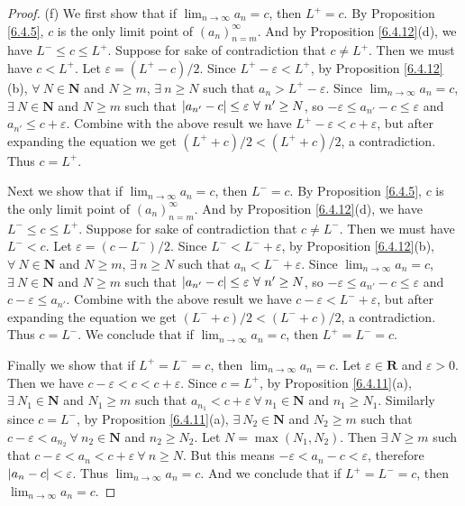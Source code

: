 \begin{proof}{(f)}
    We first show that if \(\lim_{n \to \infty} a_n = c\), then \(L^+ = c\).
    By Proposition \ref{6.4.5}, \(c\) is the only limit point of \((a_n)_{n = m}^\infty\).
    And by Proposition \ref{6.4.12}(d), we have \(L^- \leq c \leq L^+\).
    Suppose for sake of contradiction that \(c \neq L^+\).
    Then we must have \(c < L^+\).
    Let \(\varepsilon = (L^+ - c) / 2\).
    Since \(L^+ - \varepsilon < L^+\), by Proposition \ref{6.4.12}(b), \(\forall\ N \in \mathbf{N}\) and \(N \geq m\), \(\exists\ n \geq N\) such that \(a_n > L^+ - \varepsilon\).
    Since \(\lim_{n \to \infty} a_n = c\), \(\exists\ N \in \mathbf{N}\) and \(N \geq m\) such that \(\abs*{a_{n'} - c} \leq \varepsilon \ \forall\ n' \geq N\), so \(-\varepsilon \leq a_{n'} - c \leq \varepsilon\) and \(a_{n'} \leq c + \varepsilon\).
    Combine with the above result we have \(L^+ - \varepsilon < c + \varepsilon\), but after expanding the equation we get \((L^+ + c) / 2 < (L^+ + c) / 2\), a contradiction.
    Thus \(c = L^+\).

    Next we show that if \(\lim_{n \to \infty} a_n = c\), then \(L^- = c\).
    By Proposition \ref{6.4.5}, \(c\) is the only limit point of \((a_n)_{n = m}^\infty\).
    And by Proposition \ref{6.4.12}(d), we have \(L^- \leq c \leq L^+\).
    Suppose for sake of contradiction that \(c \neq L^-\).
    Then we must have \(L^- < c\).
    Let \(\varepsilon = (c - L^-) / 2\).
    Since \(L^- < L^- + \varepsilon\), by Proposition \ref{6.4.12}(b), \(\forall\ N \in \mathbf{N}\) and \(N \geq m\), \(\exists\ n \geq N\) such that \(a_n < L^- + \varepsilon\).
    Since \(\lim_{n \to \infty} a_n = c\), \(\exists\ N \in \mathbf{N}\) and \(N \geq m\) such that \(\abs*{a_{n'} - c} \leq \varepsilon \ \forall\ n' \geq N\), so \(-\varepsilon \leq a_{n'} - c \leq \varepsilon\) and \(c - \varepsilon \leq a_{n'}\).
    Combine with the above result we have \(c - \varepsilon < L^- + \varepsilon\), but after expanding the equation we get \((L^- + c) / 2 < (L^- + c) / 2\), a contradiction.
    Thus \(c = L^-\).
    We conclude that if \(\lim_{n \to \infty} a_n = c\), then \(L^+ = L^- = c\).

    Finally we show that if \(L^+ = L^- = c\), then \(\lim_{n \to \infty} a_n = c\).
    Let \(\varepsilon \in \mathbf{R}\) and \(\varepsilon > 0\).
    Then we have \(c - \varepsilon < c < c + \varepsilon\).
    Since \(c = L^+\), by Proposition \ref{6.4.11}(a), \(\exists\ N_1 \in \mathbf{N}\) and \(N_1 \geq m\) such that \(a_{n_1} < c + \varepsilon \ \forall\ n_1 \in \mathbf{N}\) and \(n_1 \geq N_1\).
    Similarly since \(c = L^-\), by Proposition \ref{6.4.11}(a), \(\exists\ N_2 \in \mathbf{N}\) and \(N_2 \geq m\) such that \(c - \varepsilon < a_{n_2} \ \forall\ n_2 \in \mathbf{N}\) and \(n_2 \geq N_2\).
    Let \(N = \max(N_1, N_2)\).
    Then \(\exists\ N \geq m\) such that \(c - \varepsilon < a_n < c + \varepsilon \ \forall\ n \geq N\).
    But this means \(-\varepsilon < a_n - c < \varepsilon\), therefore \(\abs*{a_n - c} < \varepsilon\).
    Thus \(\lim_{n \to \infty} a_n = c\).
    And we conclude that if \(L^+ = L^- = c\), then \(\lim_{n \to \infty} a_n = c\).
\end{proof}


